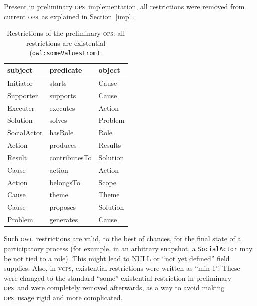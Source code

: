 \documentclass[10pt,letterpaper]{article}
\newcommand{\ops}{\textsc{ops}}
\newcommand{\vcps}{\textsc{vcps}}
\newcommand{\owl}{\textsc{owl}}
\begin{document}
Present in preliminary \ops\ implementation, all restrictions were removed from current \ops\ as explained in Section~\ref{impl}.
\begin{table}[!h]
  \centering
  \caption{Restrictions of the preliminary \ops: all restrictions are existential (\texttt{owl:someValuesFrom)}.}
  \begin{tabular}{|l|l|l|}\hline
{\bf subject} & {\bf predicate} & {\bf object} \\\hline\hline
Initiator    & starts        & Cause\\\hline
Supporter    & supports      & Cause\\\hline
Executer     & executes     & Action\\\hline
Solution     & solves      & Problem\\\hline
SocialActor  & hasRole            & Role\\\hline
Action       & produces    & Results\\\hline
Result       & contributesTo   & Solution\\\hline
Cause        & action          & Action\\\hline
Action       & belongsTo     & Scope\\\hline
Cause        & theme           & Theme\\\hline
Cause        & proposes   & Solution\\\hline
Problem      & generates     & Cause\\\hline
  \end{tabular}
  \label{ospRestr}
\end{table}

Such \owl\ restrictions are valid, to the best of chances, for the final state of a participatory process (for example, in an arbitrary snapshot, a \texttt{SocialActor} may be not tied to a role). This might lead to NULL or ``not yet defined'' field supplies.
Also, in \vcps, existential restrictions were  written as ``min 1''. 
These were changed to the standard ``some'' existential restriction in preliminary \ops\ and were completely removed afterwards, as a way to avoid making \ops\ usage rigid and more complicated.
\end{document}
